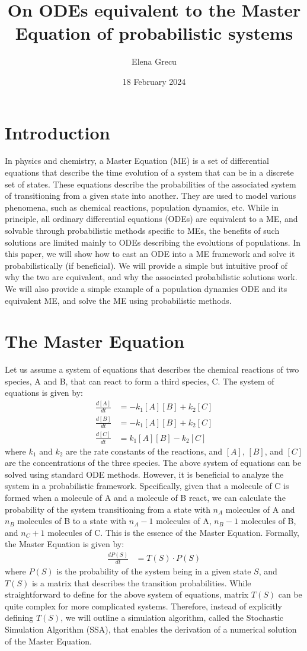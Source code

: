 \documentclass[12pt]{article}
\title{On ODEs equivalent to the Master Equation of probabilistic systems}
\author{Elena Grecu}
\date{18 February 2024}
\begin{document}
\maketitle
\section{Introduction}
In physics and chemistry, a Master Equation (ME) is a set of differential equations that describe the time evolution of a system that can be in a discrete set of states. These equations describe the probabilities of the associated system of transitioning from a given state into another. They are used to model various phenomena, such as chemical reactions, population dynamics, etc. While in principle, all ordinary differential equations (ODEs) are equivalent to a ME, and solvable through probabilistic methods specific to MEs, the benefits of such solutions are limited mainly to ODEs describing the evolutions of populations. In this paper, we will show how to cast an ODE into a ME framework and solve it probabilistically (if beneficial). We will provide a simple but intuitive proof of why the two are equivalent, and why the associated probabilistic solutions work. We will also provide a simple example of a population dynamics ODE and its equivalent ME, and solve the ME using probabilistic methods.  
\section{The Master Equation}
Let us assume a system of equations that describes the chemical reactions of two species, A and B, that can react to form a third species, C. The system of equations is given by:
\begin{align}
\frac{d[A]}{dt} &= -k_1 [A] [B] + k_2 [C] \\
\frac{d[B]}{dt} &= -k_1 [A] [B] + k_2 [C] \\
\frac{d[C]}{dt} &= k_1 [A] [B] - k_2 [C]
\end{align}
where $k_1$ and $k_2$ are the rate constants of the reactions, and $[A]$, $[B]$, and $[C]$ are the concentrations of the three species. The above system of equations can be solved using standard ODE methods. However, it is beneficial to analyze the system in a probabilistic framework. Specifically, given that a molecule of C is formed when a molecule of A and a molecule of B react, we can calculate the probability of the system transitioning from a state with $n_A$ molecules of A and $n_B$ molecules of B to a state with $n_A-1$ molecules of A, $n_B-1$ molecules of B, and $n_C+1$ molecules of C. This is the essence of the Master Equation. Formally, the Master Equation is given by:
\begin{align}
\frac{dP(S)}{dt} &= T(S) \cdot P(S)
\label{eq:ME}
\end{align}
where $P(S)$ is the probability of the system being in a given state $S$, and $T(S)$ is a matrix that describes the transition probabilities.  While straightforward to define for the above system of equations, matrix $T(S)$ can be quite complex for more complicated systems. Therefore, instead of explicitly defining $T(S)$, we will outline a simulation algorithm, called the Stochastic Simulation Algorithm (SSA), that enables the derivation of a numerical solution of the Master Equation.
\end{document}
